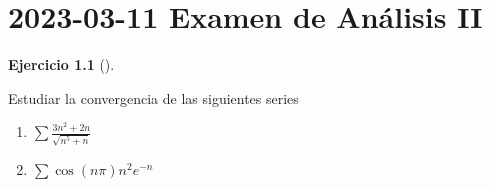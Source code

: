 \documentclass[
  spanish,
  a4paper,
]{scrreport}
\theoremstyle{definition}
\newtheorem{exercise}{Ejercicio}[chapter]
\theoremstyle{remark}
\begin{document}

\chapter{\texorpdfstring{2023-03-11 Examen de Análisis
II}{2023-03-11  Examen de Análisis II}}\label{examen-de-anuxe1lisis-ii}

\begin{exercise}[]\protect\hypertarget{exr-1}{}\label{exr-1}

Estudiar la convergencia de las siguientes series

\begin{enumerate}
\def\labelenumi{\alph{enumi}.}
\item
  \(\displaystyle \sum \frac{3n^2+2n}{\sqrt{n^5+n}}\)
\item
  \(\displaystyle \sum \cos(n\pi)n^2e^{-n}\)
\end{enumerate}

\end{exercise}
\end{document}
